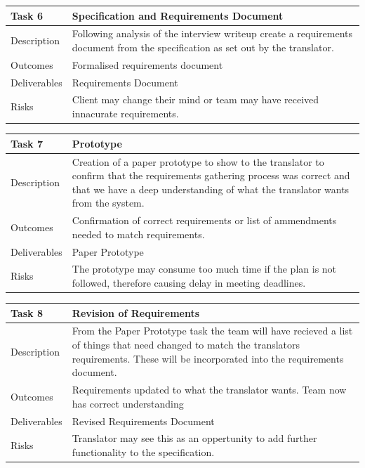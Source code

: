 \documentclass{l3proj}
\begin{document}
\begin{center}
    \begin{tabular}{ | l | p{12cm} |}
    \hline	
    Task 6 & Specification and Requirements Document \\ \hline
    Description & Following analysis of the interview writeup create a requirements document from the specification as set out by the translator. \\ \hline   
    Outcomes & Formalised requirements document \\ \hline
    Deliverables & Requirements Document \\ \hline
    Risks & Client may change their mind or team may have received innacurate requirements. \\ 
    \hline
    \end{tabular}
\end{center}

\begin{center}
    \begin{tabular}{ | l | p{12cm} |}
    \hline	
    Task 7 & Prototype \\ \hline
    Description & Creation of a paper prototype to show to the translator to confirm that the requirements gathering process was correct and that we have a deep understanding of what the translator wants from the system. \\ \hline   
    Outcomes & Confirmation of correct requirements or list of ammendments needed to match requirements. \\ \hline
    Deliverables & Paper Prototype \\ \hline
    Risks & The prototype may consume too much time if the plan is not followed, therefore causing delay in meeting deadlines. \\ 
    \hline
    \end{tabular}
\end{center}

\begin{center}
    \begin{tabular}{ | l | p{12cm} |}
    \hline	
    Task 8 & Revision of Requirements \\ \hline
    Description & From the Paper Prototype task the team will have recieved a list of things that need changed to match the translators requirements. These will be incorporated into the requirements document. \\ \hline   
    Outcomes & Requirements updated to what the translator wants. Team now has correct understanding \\ \hline
    Deliverables & Revised Requirements Document \\ \hline
    Risks & Translator may see this as an oppertunity to add further functionality to the specification. \\ 
    \hline
    \end{tabular}
\end{center}
\end{document}
